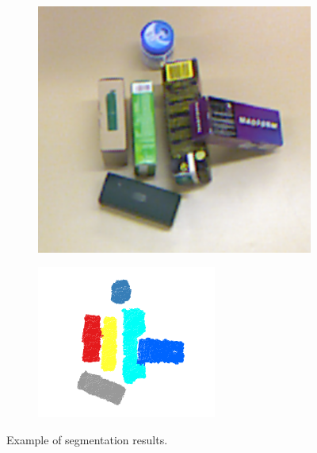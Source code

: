 \begin{figure}[tb]
\begin{subfigure}[t]{0.2\textwidth}
\end{subfigure}
\hspace{1.5cm}
\begin{subfigure}[t]{0.2\textwidth}
\centering
	\includegraphics[width=\textwidth]{Img/ObjectSegmentation/seg3_rgb.png}
\end{subfigure}
\begin{subfigure}[t]{0.2\textwidth}
\centering
\includegraphics[width=\textwidth]{Img/ObjectSegmentation/seg3_original2.png}
\end{subfigure}
\caption{Example of segmentation results.}\label{fig:seg_results}
\end{figure}

